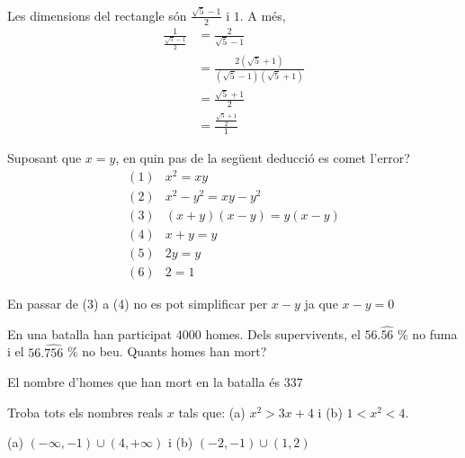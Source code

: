 \begin{indicacio}
Les dimensions del rectangle són $\frac{\sqrt{5}-1}{2}$
i $1$. A més,%
\begin{align*}
\frac{1}{\frac{\sqrt{5}-1}{2}} &=\frac{2}{\sqrt{5}-1} \\
&=\frac{2(\sqrt{5}+1)}{(\sqrt{5}-1)(\sqrt{5}+1)} \\
&=\frac{\sqrt{5}+1}{2} \\
&=\frac{\frac{\sqrt{5}+1}{2}}{1}
\end{align*}
\end{indicacio}

\begin{exercici}
Suposant que $x=y$, en quin pas de la
següent deducció es comet l’error?%
\[
\begin{array}{cc}
(1) & x^{2}=xy \\ 
(2) & x^{2}-y^{2}=xy-y^{2} \\ 
(3) & (x+y)(x-y)=y(x-y) \\ 
(4) & x+y=y \\ 
(5) & 2y=y \\ 
(6) & 2=1%
\end{array}%
\]

\end{exercici}

\begin{indicacio}
En passar de (3) a (4) no es pot simplificar per $x-y$ ja que 
$x-y=0$
\end{indicacio}

\begin{exercici}
En una batalla han participat 4000 homes. Dels supervivents, el 
$56.\widehat{56}$ \% no fuma i el $56.\widehat{756}$ \% no beu. 
Quants homes han mort?

\end{exercici}

\begin{indicacio}
El nombre d’homes que han mort en la batalla és $337$
\end{indicacio}

\begin{exercici}
Troba tots els nombres reals $x$ tals que: (a) $x^{2}>3x+4$ i
(b) $1<x^{2}<4$.

\end{exercici}

\begin{indicacio}
(a) $(-\infty ,-1)\cup (4,+\infty )$ i (b) $(-2,-1)\cup (1,2)$
\end{indicacio}

